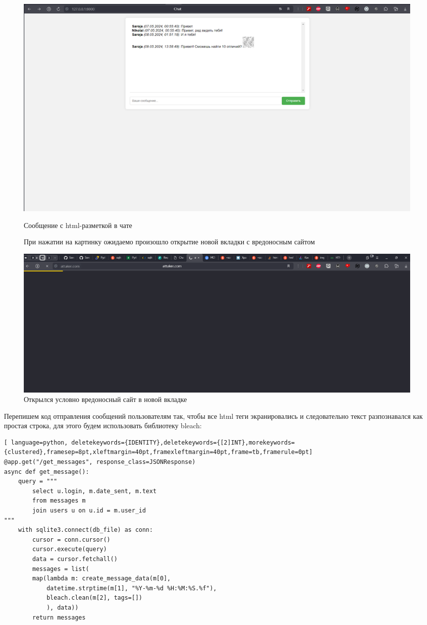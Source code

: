 \documentclass[a4paper,12pt]{diplom}
\begin{document}
	 \begin{figure}
	 {\centering
	 	\includegraphics[width=1\textwidth]{chat_xss_attack_success_send.png}
	 	\caption{Сообщение с html-разметкой в чате}
	 	\label{fig:chat_xss_attack_success_send}
	 }\par\bigskip
	 При нажатии на картинку ожидаемо произошло открытие новой вкладки с вредоносным сайтом\par\bigskip
	 {
	 	
	 	\centering
	 	\includegraphics[width=1\textwidth]{chat_xss_attack_success_referenced.png}
	 	\caption{Открылся условно вредоносный сайт в новой вкладке}
	 	\label{fig:chat_xss_attack_success_referenced}
	 }
	 \end{figure}
	 
	 
	 \pagebreak
	 Перепишем код отправления сообщений пользователям так, чтобы все html теги экранировались и следовательно текст разпознавался как простая строка, для этого будем использовать библиотеку bleach:
	 
	 
	 \begin{lstlisting}[ language=python, deletekeywords={IDENTITY},deletekeywords={[2]INT},morekeywords={clustered},framesep=8pt,xleftmargin=40pt,framexleftmargin=40pt,frame=tb,framerule=0pt]    
@app.get("/get_messages", response_class=JSONResponse)
async def get_message():
	query = """
		select u.login, m.date_sent, m.text
		from messages m
		join users u on u.id = m.user_id
"""
	with sqlite3.connect(db_file) as conn:
		cursor = conn.cursor()
		cursor.execute(query)
		data = cursor.fetchall()
		messages = list(
		map(lambda m: create_message_data(m[0],
			datetime.strptime(m[1], "%Y-%m-%d %H:%M:%S.%f"),
			bleach.clean(m[2], tags=[])
			), data))
		return messages
	 \end{lstlisting}
	 
\end{document}
